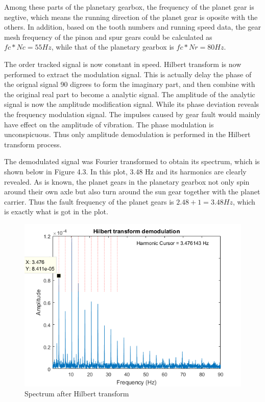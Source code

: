 Among these parts of the planetary gearbox, the frequency of the planet gear is negtive, which means the running direction of the planet gear is oposite with the others. In addition, based on the tooth numbers and running speed data, the gear mesh frequency of the pinon and spur gears could be calculated as $fc * Nc = 55 Hz$, while that of the planetary gearbox is $fc * Nr = 80 Hz$.

The order tracked signal is now constant in speed. Hilbert transform is now performed to extract the modulation signal. This is actually delay the phase of the orignal signal 90 digrees to form the imaginary part, and then combine with the original real part to become a analytic signal. The amplitude of the analytic signal is now the amplitude modification signal. While its phase deviation reveals the frequency modulation signal. The impulses caused by gear fault would mainly have effect on the amplitude of vibration. The phase modulation is unconspicuous. Thus only amplitude demodulation is performed in the Hilbert transform process.

The demodulated signal was Fourier transformed to obtain its spectrum, which is shown below in Figure 4.3. In this plot, 3.48 Hz and its harmonics are clearly revealed. As is known, the planet gears in the planetary gearbox not only spin around their own axle but also turn around the sun gear together with the planet carrier. Thus the fault frequency of the planet gears is $2.48 + 1 = 3.48 Hz$, which is exactly what is got in the plot.

\begin{figure}[h]
	\centering
	\includegraphics[scale =0.8]{hilbert}
	\caption{Spectrum after Hilbert transform}
	\label{hilbert}
\end{figure}


